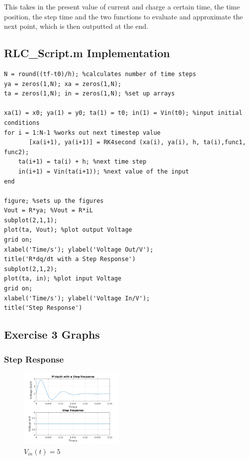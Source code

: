 \documentclass[11pt,a4paper]{article}
\begin{document}
This takes in the present value of current and charge a certain time, the time position, the step time and the two functions to evaluate and approximate the next point, which is then outputted at the end.

\subsection{RLC\_Script.m Implementation}

\begin{verbatim}
N = round((tf-t0)/h); %calculates number of time steps
ya = zeros(1,N); xa = zeros(1,N);
ta = zeros(1,N); in = zeros(1,N); %set up arrays

xa(1) = x0; ya(1) = y0; ta(1) = t0; in(1) = Vin(t0); %input initial conditions
for i = 1:N-1 %works out next timestep value
	   [xa(i+1), ya(i+1)] = RK4second (xa(i), ya(i), h, ta(i),func1, func2);
    ta(i+1) = ta(i) + h; %next time step
    in(i+1) = Vin(ta(i+1)); %next value of the input
end

figure; %sets up the figures
Vout = R*ya; %Vout = R*iL
subplot(2,1,1);
plot(ta, Vout); %plot output Voltage
grid on;
xlabel('Time/s'); ylabel('Voltage Out/V');
title('R*dq/dt with a Step Response')
subplot(2,1,2);
plot(ta, in); %plot input Voltage
grid on;
xlabel('Time/s'); ylabel('Voltage In/V');
title('Step Response')
\end{verbatim}

\subsection{Exercise 3 Graphs}
\subsubsection{Step Response}

\begin{figure}

	\vspace{-6mm}
  		\includegraphics[width=0.45\textwidth]{Ex3_Figs/Step.png}
	\vspace{-6mm}
  	\caption{$V_{in}(t)= 5$}
  	\label{fig:ex3g1}

\end{figure}
\end{document}
